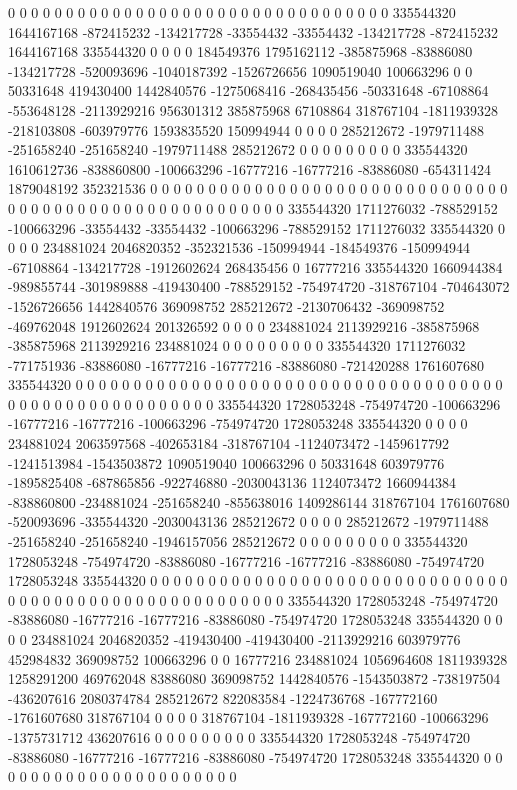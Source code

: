 0 0 0 0 0 0 0 0 0 0 0 0 0 0 0 0 0 0 0 0 0 0 0 0 0 0 0 0 0 0 0 0 0 335544320 1644167168 -872415232 -134217728 -33554432 -33554432 -134217728 -872415232 1644167168 335544320 0 0 0 0 184549376 1795162112 -385875968 -83886080 -134217728 -520093696 -1040187392 -1526726656 1090519040 100663296 0 0 50331648 419430400 1442840576 -1275068416 -268435456 -50331648 -67108864 -553648128 -2113929216 956301312 385875968 67108864 318767104 -1811939328 -218103808 -603979776 1593835520 150994944 0 0 0 0 285212672 -1979711488 -251658240 -251658240 -1979711488 285212672 0 0 0 0 0 0 0 0 0 335544320 1610612736 -838860800 -100663296 -16777216 -16777216 -83886080 -654311424 1879048192 352321536 0 0 0 0 0 0 0 0 0 0 0 0 0 0 0 0 0 0 0 0 0 0
0 0 0 0 0 0 0 0 0 0 0 0 0 0 0 0 0 0 0 0 0 0 0 0 0 0 0 0 0 0 0 0 0 335544320 1711276032 -788529152 -100663296 -33554432 -33554432 -100663296 -788529152 1711276032 335544320 0 0 0 0 234881024 2046820352 -352321536 -150994944 -184549376 -150994944 -67108864 -134217728 -1912602624 268435456 0 16777216 335544320 1660944384 -989855744 -301989888 -419430400 -788529152 -754974720 -318767104 -704643072 -1526726656 1442840576 369098752 285212672 -2130706432 -369098752 -469762048 1912602624 201326592 0 0 0 0 234881024 2113929216 -385875968 -385875968 2113929216 234881024 0 0 0 0 0 0 0 0 0 335544320 1711276032 -771751936 -83886080 -16777216 -16777216 -83886080 -721420288 1761607680 335544320 0 0 0 0 0 0 0 0 0 0 0 0 0 0 0 0 0 0 0 0 0 0
0 0 0 0 0 0 0 0 0 0 0 0 0 0 0 0 0 0 0 0 0 0 0 0 0 0 0 0 0 0 0 0 0 335544320 1728053248 -754974720 -100663296 -16777216 -16777216 -100663296 -754974720 1728053248 335544320 0 0 0 0 234881024 2063597568 -402653184 -318767104 -1124073472 -1459617792 -1241513984 -1543503872 1090519040 100663296 0 50331648 603979776 -1895825408 -687865856 -922746880 -2030043136 1124073472 1660944384 -838860800 -234881024 -251658240 -855638016 1409286144 318767104 1761607680 -520093696 -335544320 -2030043136 285212672 0 0 0 0 285212672 -1979711488 -251658240 -251658240 -1946157056 285212672 0 0 0 0 0 0 0 0 0 335544320 1728053248 -754974720 -83886080 -16777216 -16777216 -83886080 -754974720 1728053248 335544320 0 0 0 0 0 0 0 0 0 0 0 0 0 0 0 0 0 0 0 0 0 0
0 0 0 0 0 0 0 0 0 0 0 0 0 0 0 0 0 0 0 0 0 0 0 0 0 0 0 0 0 0 0 0 0 335544320 1728053248 -754974720 -83886080 -16777216 -16777216 -83886080 -754974720 1728053248 335544320 0 0 0 0 234881024 2046820352 -419430400 -419430400 -2113929216 603979776 452984832 369098752 100663296 0 0 16777216 234881024 1056964608 1811939328 1258291200 469762048 83886080 369098752 1442840576 -1543503872 -738197504 -436207616 2080374784 285212672 822083584 -1224736768 -167772160 -1761607680 318767104 0 0 0 0 318767104 -1811939328 -167772160 -100663296 -1375731712 436207616 0 0 0 0 0 0 0 0 0 335544320 1728053248 -754974720 -83886080 -16777216 -16777216 -83886080 -754974720 1728053248 335544320 0 0 0 0 0 0 0 0 0 0 0 0 0 0 0 0 0 0 0 0 0 0
